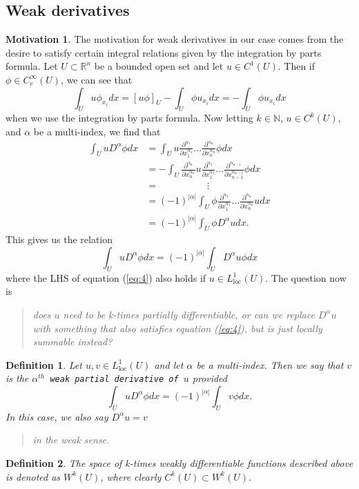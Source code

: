\documentclass[11pt]{article}
\newtheorem{definition}{Definition}
\theoremstyle{definition}
\newtheorem*{motivation}{Motivation}
\begin{document}
\subsection{Weak derivatives}
\begin{motivation}
	The motivation for weak derivatives in our case comes from the desire to satisfy certain integral relations given by the integration by parts formula.
	Let $U \subset \mathbb{R}^n$ be a bounded open set and let $u\in C^1(U)$. Then if $\phi \in C_{c}^{\infty}(U)$, we can see that
	\begin{equation*}
		\int_U u\phi_{x_i}dx = [u\phi]_U - \int_U \phi u_{x_i}dx = - \int_U \phi u_{x_i}dx
	\end{equation*}
	when we use the integration by parts formula. Now letting $k\in \mathbb{N}$, $u \in C^k(U)$, and $\alpha$ be a multi-index, we find that
	\begin{equation*}
		\begin{aligned}
			\int_U u D^{\alpha}\phi dx &= \int_U u \frac{\partial^{\alpha_1}}{\partial x_1^{\alpha_1}}\dots\frac{\partial^{\alpha_n}}{\partial x_n^{\alpha_n}}\phi dx \\
						   &= - \int_U \frac{\partial^{\alpha_n}}{\partial x_n^{\alpha_n}}u \frac{\partial^{\alpha_1}}{\partial x_1^{\alpha_1}}\dots\frac{\partial^{\alpha_{n-1}}}{\partial x_{n-1}^{\alpha_{n-1}}}\phi dx \\
						   &= \quad\qquad\qquad\vdots \\ 
						   &= (-1)^{|\alpha|}\int_U \phi\frac{\partial^{\alpha_1}}{\partial x_1^{\alpha_1}}\dots\frac{\partial^{\alpha_n}}{\partial x_n^{\alpha_n}}u dx \\
						   &= (-1)^{|\alpha|}\int_U \phi D^{\alpha}u dx.
		\end{aligned}
	\end{equation*}
	This gives us the relation
	\begin{equation}
		\label{eq:4}
		\int_U u D^{\alpha}\phi dx = (-1)^{|\alpha|}\int_U D^{\alpha}u\phi  dx
	\end{equation}
	where the LHS of equation (\ref{eq:4}) also holds if $u\in L_{\text{loc}}^1(U)$.
	The question now is \blockquote{\textit{does $u$ need to be k-times partially differentiable, or can we replace $D^{\alpha}u$ with something that also satisfies
	equation (\ref{eq:4}), but is just locally summable instead?}}
\end{motivation}
\begin{definition}
	Let $u,v \in L_{\text{loc}}^1(U)$ and let $\alpha$ be a multi-index. Then we say that $v$ is the 
	\texttt{$\alpha^{th}$ weak partial derivative of $u$} provided
	\begin{equation*}
		\int_U u D^{\alpha}\phi dx = (-1)^{|\alpha|}\int_U v \phi dx.
	\end{equation*}
	In this case, we also say $D^{\alpha}u = v$ \blockquote{in the weak sense.}
\end{definition}
\begin{definition}
	The space of k-times weakly differentiable functions described above is denoted as $W^k(U)$, where clearly $C^k(U) \subset W^k(U)$.
\end{definition}
\newpage
\end{document}
